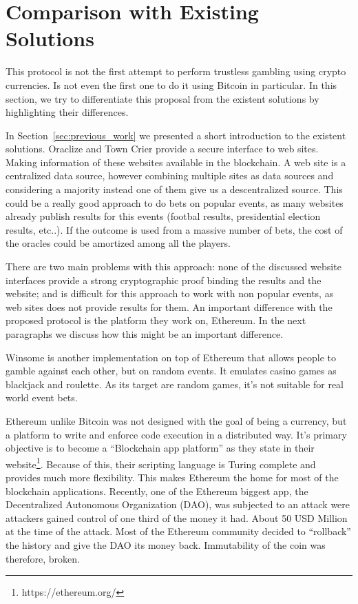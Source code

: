 \section{Comparison with Existing Solutions} \label{sec:discussion_previous_work}

This protocol is not the first attempt to perform trustless gambling using
  crypto currencies.
Is not even the first one to do it using Bitcoin in particular.
In this section, we try to differentiate this proposal from the existent
  solutions by highlighting their differences.

In Section~\ref{sec:previous_work} we presented a short introduction to the
  existent solutions.
Oraclize and Town Crier provide a secure interface to web sites.
Making information of these websites available in the blockchain.
A web site is a centralized data source, however combining multiple sites as
  data sources and considering a majority instead one of them give us a
  descentralized source.
This could be a really good approach to do bets on popular events, as
  many websites already publish results for this events (footbal results,
  presidential election results, etc..).
If the outcome is used from a massive number of bets, the cost of the oracles
  could be amortized among all the players.

There are two main problems with this approach: none of the discussed
  website interfaces provide a strong cryptographic proof binding the results
  and the website; and is difficult for this approach to work with non popular
  events, as web sites does not provide results for them.
An important difference with the proposed protocol is the platform they work
  on, Ethereum.
In the next paragraphs we discuss how this might be an important difference.

Winsome is another implementation on top of Ethereum that allows people to
  gamble against each other, but on random events.
It emulates casino games as blackjack and roulette.
As its target are random games, it's not suitable for real world event bets.

Ethereum unlike Bitcoin was not designed with the goal of being a currency,
  but a platform to write and enforce code execution in a distributed
  way.
It's primary objective is to become a ``Blockchain app platform'' as they
  state in their website\footnote{https://ethereum.org/}.
Because of this, their scripting language is Turing complete and provides much
  more flexibility.
This makes Ethereum the home for most of the blockchain applications.
Recently, one of the Ethereum biggest app, the Decentralized Autonomous
  Organization (DAO), was subjected to an attack were attackers gained control
  of one third of the money it had.
About 50 USD Million at the time of the attack.
Most of the Ethereum community decided to ``rollback'' the history and give the
  DAO its money back.
Immutability of the coin was therefore, broken.

